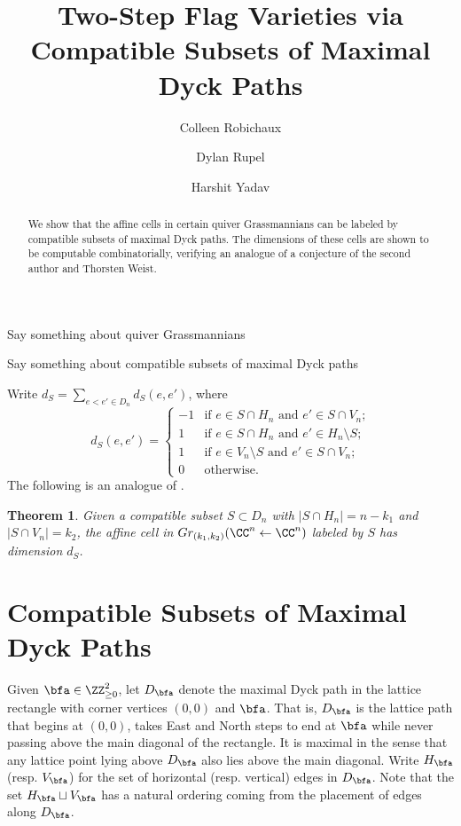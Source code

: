 \usepackage[margin=1in]{geometry}
\usepackage{amsmath.amssymb,latexsym}

\newtheorem{theorem}{Theorem}

\title{Two-Step Flag Varieties via Compatible Subsets of Maximal Dyck Paths}

\author{Colleen Robichaux}
\author{Dylan Rupel}
\author{Harshit Yadav}


  \begin{abstract}
    We show that the affine cells in certain quiver Grassmannians can be labeled by compatible subsets of maximal Dyck paths.
    The dimensions of these cells are shown to be computable combinatorially, verifying an analogue of a conjecture of the second author and Thorsten Weist.
  \end{abstract}
  \maketitle

  Say something about quiver Grassmannians

  Say something about compatible subsets of maximal Dyck paths

  Write $d_S=\sum\limits_{e<e'\in D_n} d_S(e,e')$, where
  \[
    d_S(e,e')=
    \begin{cases}
      -1 & \text{if $e\in S\cap H_n$ and $e'\in S\cap V_n$;}\\
      1 & \text{if $e\in S\cap H_n$ and $e'\in H_n\setminus S$;}\\
      1 & \text{if $e\in V_n\setminus S$ and $e'\in S\cap V_n$;}\\
      0 & \text{otherwise.}
    \end{cases}
  \]
  The following is an analogue of \cite[Conjecture 5.21]{rupel-weist}.
  \begin{theorem}
    Given a compatible subset $S\subset D_n$ with $|S\cap H_n|=n-k_1$ and $|S\cap V_n|=k_2$, the affine cell in $Gr_{(k_1,k_2)}(\CC^n\leftarrow\CC^n)$ labeled by $S$ has dimension $d_S$.
  \end{theorem}

  \section{Compatible Subsets of Maximal Dyck Paths}
  Given $\bfa\in\ZZ_{\ge0}^2$, let $D_\bfa$ denote the maximal Dyck path in the lattice rectangle with corner vertices $(0,0)$ and $\bfa$.
  That is, $D_\bfa$ is the lattice path that begins at $(0,0)$, takes East and North steps to end at $\bfa$ while never passing above the main diagonal of the rectangle.
  It is maximal in the sense that any lattice point lying above $D_\bfa$ also lies above the main diagonal.
  Write $H_\bfa$ (resp. $V_\bfa$) for the set of horizontal (resp. vertical) edges in $D_\bfa$.
  Note that the set $H_\bfa\sqcup V_\bfa$ has a natural ordering coming from the placement of edges along $D_\bfa$. 

